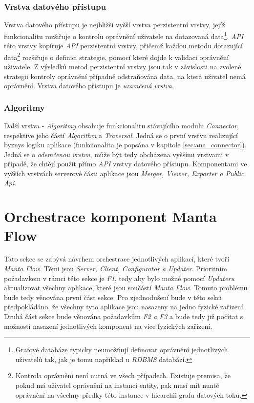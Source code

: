 \subsubsection{Vrstva datového přístupu}
\label{sec:des_data_access}
Vrstva datového přístupu je nejbližší vyšší vrstva perzistentní vrstvy, jejíž funkcionalitu rozšiřuje o kontrolu oprávnění uživatele na dotazovaná data\footnote{Grafové databáze typicky neumožňují definovat oprávnění jednotlivých uživatelů tak, jak je tomu například u \textit{RDBMS} databází.}. \textit{API} této vrstvy kopíruje \textit{API} perzistentní vrstvy, přičemž každou metodu dotazující data\footnote{Kontrola oprávnění není nutná ve všech případech. Existuje premisa, že pokud má uživatel oprávnění na instanci entity, pak musí mít nuntě oprávnění na všechny předky této instance v hiearchii grafu datových toků.} rozšiřuje o definici strategie, pomocí které dojde k validaci oprávnění uživatele. Z výsledků metod perzistentní vrstvy jsou tak v závislosti na zvolené strategii kontroly oprávnění případně odstraňována data, na která uživatel nemá oprávnění. Vrstva datového přístupu je \textit{uzamčená vrstva}.

\subsubsection{Algoritmy}
Další vrstva - \textit{Algoritmy} obsahuje funkcionalitu stávajícího modulu \textit{Connector}, respektive jeho částí \textit{Algorithm} a \textit{Traversal}. Jedná se o první vrstvu realizující byznys logiku aplikace (funkcionalita je popsána v kapitole \ref{sec:ana_connector}). Jedná se o \textit{odemčenou vrstvu}, může být tedy obcházena vyššími vrstvami v případě, že chtějí použít přímo \textit{API} vrstvy datového přístupu. Komponentami ve vyšších vrstvách serverové části aplikace jsou \textit{Merger, Viewer, Exporter a Public Api}.


\section{Orchestrace komponent Manta Flow}
\label{sec:des_orchestration}
Tato sekce se zabývá návrhem orchestrace jednotlivých aplikací, které tvoří \textit{Manta Flow}. Těmi jsou \textit{Server, Client, Configurator a Updater}. Prioritním požadavkem v rámci této sekce je \textit{F1}, tedy aby bylo možné pomocí \textit{Updateru} aktualizovat všechny aplikace, které jsou součástí \textit{Manta Flow}. Tomuto problému bude tedy věnována první část sekce. Pro zjednodušení bude v této sekci předpokládáno, že všechny tyto aplikace jsou nasazeny na jedno fyzické zařizení. Druhá část sekce bude věnována požadavkům \textit{F2 a F3} a bude tedy již počítat s možností nasazení jednotlivých komponent na více fyzických zařízení.

